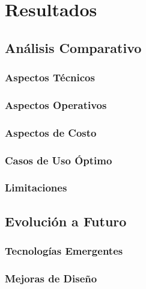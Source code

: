 \chapter{Resultados}

\section{Análisis Comparativo}

\subsection{Aspectos Técnicos}

\subsection{Aspectos Operativos}

\subsection{Aspectos de Costo}

\subsection{Casos de Uso Óptimo}

\subsection{Limitaciones}

\section{Evolución a Futuro}

\subsection{Tecnologías Emergentes}

\subsection{Mejoras de Diseño}